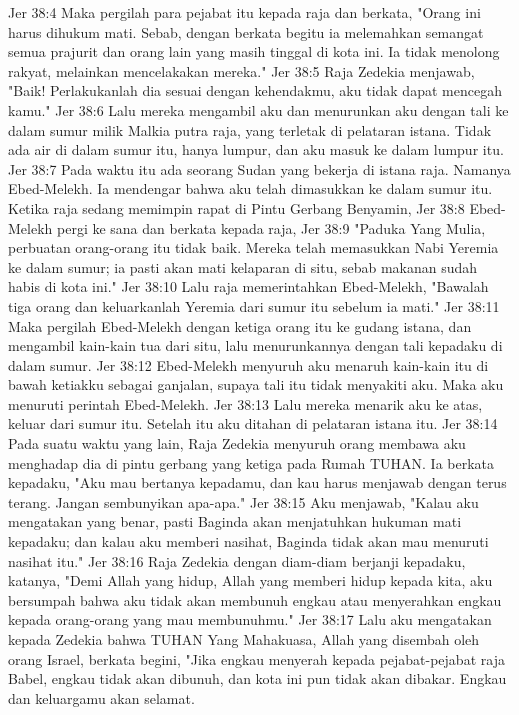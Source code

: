 Jer 38:4  Maka pergilah para pejabat itu kepada raja dan berkata, "Orang ini harus dihukum mati. Sebab, dengan berkata begitu ia melemahkan semangat semua prajurit dan orang lain yang masih tinggal di kota ini. Ia tidak menolong rakyat, melainkan mencelakakan mereka."
Jer 38:5  Raja Zedekia menjawab, "Baik! Perlakukanlah dia sesuai dengan kehendakmu, aku tidak dapat mencegah kamu."
Jer 38:6  Lalu mereka mengambil aku dan menurunkan aku dengan tali ke dalam sumur milik Malkia putra raja, yang terletak di pelataran istana. Tidak ada air di dalam sumur itu, hanya lumpur, dan aku masuk ke dalam lumpur itu.
Jer 38:7  Pada waktu itu ada seorang Sudan yang bekerja di istana raja. Namanya Ebed-Melekh. Ia mendengar bahwa aku telah dimasukkan ke dalam sumur itu. Ketika raja sedang memimpin rapat di Pintu Gerbang Benyamin,
Jer 38:8  Ebed-Melekh pergi ke sana dan berkata kepada raja,
Jer 38:9  "Paduka Yang Mulia, perbuatan orang-orang itu tidak baik. Mereka telah memasukkan Nabi Yeremia ke dalam sumur; ia pasti akan mati kelaparan di situ, sebab makanan sudah habis di kota ini."
Jer 38:10  Lalu raja memerintahkan Ebed-Melekh, "Bawalah tiga orang dan keluarkanlah Yeremia dari sumur itu sebelum ia mati."
Jer 38:11  Maka pergilah Ebed-Melekh dengan ketiga orang itu ke gudang istana, dan mengambil kain-kain tua dari situ, lalu menurunkannya dengan tali kepadaku di dalam sumur.
Jer 38:12  Ebed-Melekh menyuruh aku menaruh kain-kain itu di bawah ketiakku sebagai ganjalan, supaya tali itu tidak menyakiti aku. Maka aku menuruti perintah Ebed-Melekh.
Jer 38:13  Lalu mereka menarik aku ke atas, keluar dari sumur itu. Setelah itu aku ditahan di pelataran istana itu.
Jer 38:14  Pada suatu waktu yang lain, Raja Zedekia menyuruh orang membawa aku menghadap dia di pintu gerbang yang ketiga pada Rumah TUHAN. Ia berkata kepadaku, "Aku mau bertanya kepadamu, dan kau harus menjawab dengan terus terang. Jangan sembunyikan apa-apa."
Jer 38:15  Aku menjawab, "Kalau aku mengatakan yang benar, pasti Baginda akan menjatuhkan hukuman mati kepadaku; dan kalau aku memberi nasihat, Baginda tidak akan mau menuruti nasihat itu."
Jer 38:16  Raja Zedekia dengan diam-diam berjanji kepadaku, katanya, "Demi Allah yang hidup, Allah yang memberi hidup kepada kita, aku bersumpah bahwa aku tidak akan membunuh engkau atau menyerahkan engkau kepada orang-orang yang mau membunuhmu."
Jer 38:17  Lalu aku mengatakan kepada Zedekia bahwa TUHAN Yang Mahakuasa, Allah yang disembah oleh orang Israel, berkata begini, "Jika engkau menyerah kepada pejabat-pejabat raja Babel, engkau tidak akan dibunuh, dan kota ini pun tidak akan dibakar. Engkau dan keluargamu akan selamat.
